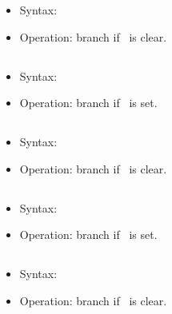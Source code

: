 \begin{itemize}
\item Syntax: 
\item Operation: branch if \flagN\ is clear.
\end{itemize}

\subsection{}

\begin{itemize}
\item Syntax: 
\item Operation: branch if \flagZ\ is set.
\end{itemize}

\subsection{}

\begin{itemize}
\item Syntax: 
\item Operation: branch if \flagZ\ is clear.
\end{itemize}

\subsection{}

\begin{itemize}
\item Syntax: 
\item Operation: branch if \flagC\ is set.
\end{itemize}

\subsection{}

\begin{itemize}
\item Syntax: 
\item Operation: branch if \flagC\ is clear.
\end{itemize}

\subsection{}


